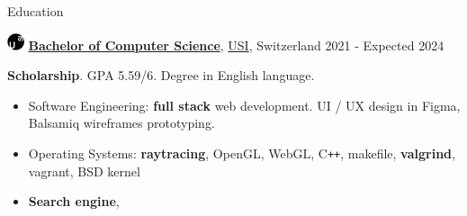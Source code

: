\documentclass{cv} %
\def\titlelistvspace{-0.15cm}
\begin{document}
\begin{rSection}{Education}

    \includegraphics[width=0.5cm, trim={0cm 5cm 0cm 0cm}]{usi-icon.png}
    {\bf \underline{Bachelor of Computer Science}},
    \href{https://www.usi.ch/en}{USI}, Switzerland
    \hfill {2021 - Expected 2024}

    \textbf{Scholarship}. GPA 5.59/6. Degree in English language.

    \vspace{\titlelistvspace}\begin{itemize}
        \itemsep -3pt {}
        \item Software Engineering: \textbf{full stack} web development.
              UI / UX design in Figma, Balsamiq wireframes prototyping.
        \item Operating Systems:
              \textbf{raytracing},
              OpenGL,
              WebGL,
              C\texttt{++},
              makefile,
              \textbf{valgrind},
              vagrant,
              BSD kernel
        \item \textbf{Search engine},

\end{itemize}
\end{rSection}
\end{document}
